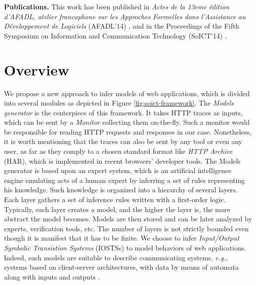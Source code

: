 \textbf{Publications.} This work has been published in
\emph{Actes de la 13eme {\'e}dition d'AFADL, atelier francophone
sur les Approches Formelles dans l'Assistance au
D{\'e}veloppement de Logiciels} (AFADL'14)
\cite{durand2014inference}, and in the Proceedings of the Fifth
Symposium on Information and Communication Technology (SoICT'14)
\cite{DBLP:conf/soict/DurandS14}.


\section{Overview}

We propose a new approach to infer models of web applications,
which is divided into several modules as depicted in Figure
\ref{fig:soict-framework}. The \textit{Models generator} is the
centerpiece of this framework. It takes HTTP traces as inputs,
which can be sent by a \textit{Monitor} collecting them on-the-fly.
Such a monitor would be responsible for reading HTTP requests and
responses in our case. Nonetheless, it is worth mentioning that the
traces can also be sent by any tool or even any user, as far as
they comply to a chosen standard format like \textit{HTTP
Archive} (HAR), which is implemented in recent browsers'
developer tools. The Models generator is based upon an expert
system, which is an artificial intelligence engine emulating acts
of a human expert by inferring a set of rules representing his
knowledge.  Such knowledge is organized into a hierarchy of
several layers.  Each layer gathers a set of inference rules
written with a first-order logic. Typically, each layer creates a
model, and the higher the layer is, the more abstract the model
becomes. Models are then stored and can be later analyzed by
experts, verification tools, etc. The number of layers is not
strictly bounded even though it is manifest that it has to be
finite. We choose to infer \emph{Input/Output Symbolic Transistion
Systems} (IOSTSs) to model behaviors of web applications. Indeed,
such models are suitable to describe communicating systems,
\emph{e.g.}, systems based on client-server architectures, with
data by means of automata along with inputs and outputs
\cite{Rusu:2000:AST:647982.743536}.

